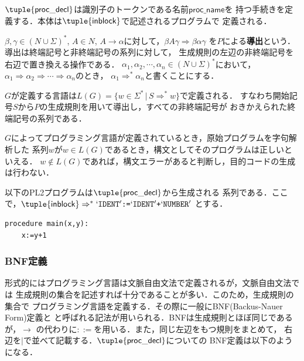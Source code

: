 \documentclass[a4j,dvipdfmx]{jbook}
\begin{document}
$\tuple{\mathsf{proc\_decl}}$は識別子のトークンである名前$\mathsf{proc\_name}$を
持つ手続きを定義する．本体は$\tuple{\mathsf{inblock}}$で記述されるプログラムで
定義される．

$\beta,\gamma\in(N\cup\Sigma)^\ast$,
$A\in N$, $A\rightarrow\alpha$に対して，$\beta A\gamma\Rightarrow \beta\alpha\gamma$
を$P$による{\bf 導出}という．導出は終端記号と非終端記号の系列に対して，
生成規則の左辺の非終端記号を右辺で置き換える操作である．
$\alpha_1,\alpha_2,\cdots,\alpha_n\in (N\cup\Sigma)^\ast$において，
$\alpha_1\Rightarrow\alpha_2\Rightarrow\cdots\Rightarrow\alpha_n$のとき，
$\alpha_1\Rightarrow^\ast\alpha_n$と書くことにする．

$G$が定義する言語は$L(G)=\{w\in\Sigma^\ast\,|\,S\Rightarrow^\ast w\}$で定義される．
すなわち開始記号$S$から$P$の生成規則を用いて導出し，すべての非終端記号が
おきかえられた終端記号の系列である．

$G$によってプログラミング言語が定義されているとき，原始プログラムを字句解析した
系列$w$が$w\in L(G)$であるとき，構文としてそのプログラムは正しいといえる．
$w\notin L(G)$であれば，構文エラーがあると判断し，目的コードの生成は行わない．

\begin{Exmp}\label{DerivEx1}
以下のPL2プログラムは$\tuple{\mathsf{proc\_decl}}$から生成される
系列である．ここで，$\tuple{\mathsf{inblock}}\Rightarrow^\ast
`\texttt{IDENT}' \texttt{:=} `\texttt{IDENT}' \texttt{+} `\texttt{NUMBER}'$
とする．
\begin{Verbatim}[frame=single]
  procedure main(x,y):
    x:=y+1
\end{Verbatim}
\end{Exmp}

\subsubsection{BNF定義}

形式的にはプログラミング言語は文脈自由文法で定義されるが，文脈自由文法では
生成規則の集合を記述すれば十分であることが多い．このため，生成規則の集合で
プログラミング言語を定義する．その際に一般にBNF(Backus-Nauer Form)定義と
と呼ばれる記法が用いられる．BNFは生成規則とほぼ同じであるが，$\rightarrow$
の代わりに$\mathtt{::=}$を用いる．また，同じ左辺をもつ規則をまとめて，
右辺を$\texttt{|}$で並べて記載する．$\tuple{\mathsf{proc\_decl}}$についての
BNF定義は以下のようになる．
\end{document}
